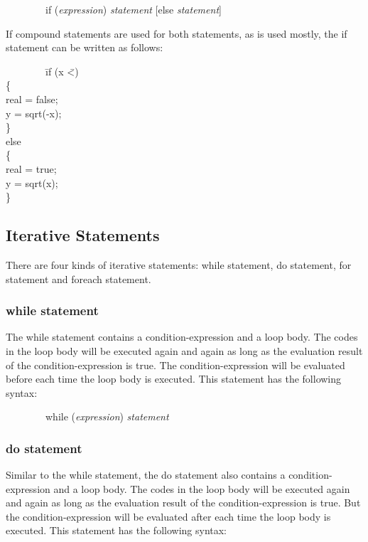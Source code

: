 \documentclass[12pt,psfig,a4]{article}
\begin{document}
\begin{code}
\begin{tabbing}
~~~~~~~~if (\textit{expression}) \textit{statement} [else \textit{statement}]
\end{tabbing}
\end{code}

If compound statements are used for both statements, as is used mostly, the if statement can be written as follows:

\begin{code}
\begin{tabbing}
~~~~~~~~\= if (x \= \textless {}) \\
\> \{ \\
\> \> real = false; \\
\> \> y = sqrt(-x); \\
\> \} \\
\> else \\
\> \{ \\
\> \> real = true; \\
\> \> y = sqrt(x); \\
\> \}
\end{tabbing}
\end{code}

\subsection{Iterative Statements}
There are four kinds of iterative statements: while statement, do statement, for statement and foreach statement.

\subsubsection{while statement}
The while statement contains a condition-expression and a loop body. The codes in the loop body will be executed again and again as long as the evaluation result of the condition-expression is true. The condition-expression will be evaluated before each time the loop body is executed. This statement has the following syntax:

\begin{code}
\begin{tabbing}
~~~~~~~~while (\textit{expression}) \textit{statement}
\end{tabbing}
\end{code}

\subsubsection{do statement}
Similar to the while statement, the do statement also contains a condition-expression and a loop body. The codes in the loop body will be executed again and again as long as the evaluation result of the condition-expression is true. But the condition-expression will be evaluated after each time the loop body is executed. This statement has the following syntax:
\end{document}
